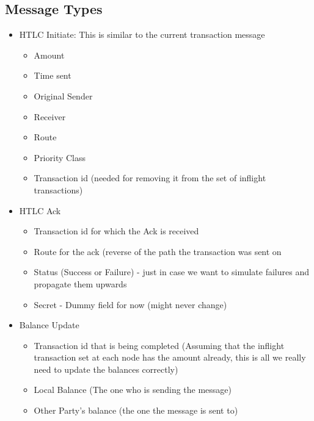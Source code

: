 \documentclass[a4paper]{article}
\begin{document}
\subsection{Message Types}
\begin{itemize}
    \item HTLC Initiate: This is similar to the current transaction message
        \begin{itemize}
            \item Amount
            \item Time sent
            \item Original Sender
            \item Receiver
            \item Route
            \item Priority Class
            \item Transaction id (needed for removing it from the set of inflight transactions)
        \end{itemize}

    \item HTLC Ack
        \begin{itemize}
            \item Transaction id for which the Ack is received
            \item Route for the ack (reverse of the path the transaction was sent on
            \item Status (Success or Failure) - just in case we want to simulate failures and propagate them upwards
            \item Secret - Dummy field for now (might never change)
        \end{itemize}

    \item Balance Update
        \begin{itemize}
            \item Transaction id that is being completed (Assuming that the inflight transaction set at each node has the amount already, this is all we really need to update the balances correctly)
            \item Local Balance (The one who is sending the message)
            \item Other Party's balance (the one the message is sent to)
        \end{itemize}
\end{itemize}
\end{document}
